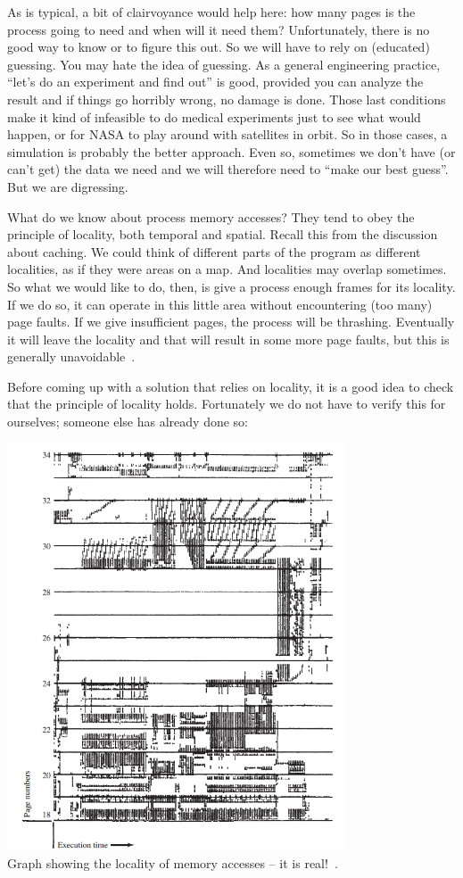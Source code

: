 As is typical, a bit of clairvoyance would help here: how many pages is the process going to need and when will it need them? Unfortunately, there is no good way to know or to figure this out. So we will have to rely on (educated) guessing. You may hate the idea of guessing. As a general engineering practice, ``let's do an experiment and find out'' is good, provided you can analyze the result and if things go horribly wrong, no damage is done. Those last conditions make it kind of infeasible to do medical experiments just to see what would happen, or for NASA to play around with satellites in orbit. So in those cases, a simulation is probably the better approach. Even so, sometimes we don't have (or can't get) the data we need and we will therefore need to ``make our best guess''. But we are digressing.

What do we know about process memory accesses? They tend to obey the principle of locality, both temporal and spatial. Recall this from the discussion about caching. We could think of different parts of the program as different localities, as if they were areas on a map. And localities may overlap sometimes. So what we would like to do, then, is give a process enough frames for its locality. If we do so, it can operate in this little area without encountering (too many) page faults. If we give insufficient pages, the process will be thrashing. Eventually it will leave the locality and that will result in some more page faults, but this is generally unavoidable~\cite{osc}.  

Before coming up with a solution that relies on locality, it is a good idea to check that the principle of locality holds. Fortunately we do not have to verify this for ourselves; someone else has already done so:

\begin{center}
\includegraphics[width=0.75\textwidth]{images/locality.png}\\
Graph showing the locality of memory accesses -- it is real!~\cite{locality}.
\end{center}

